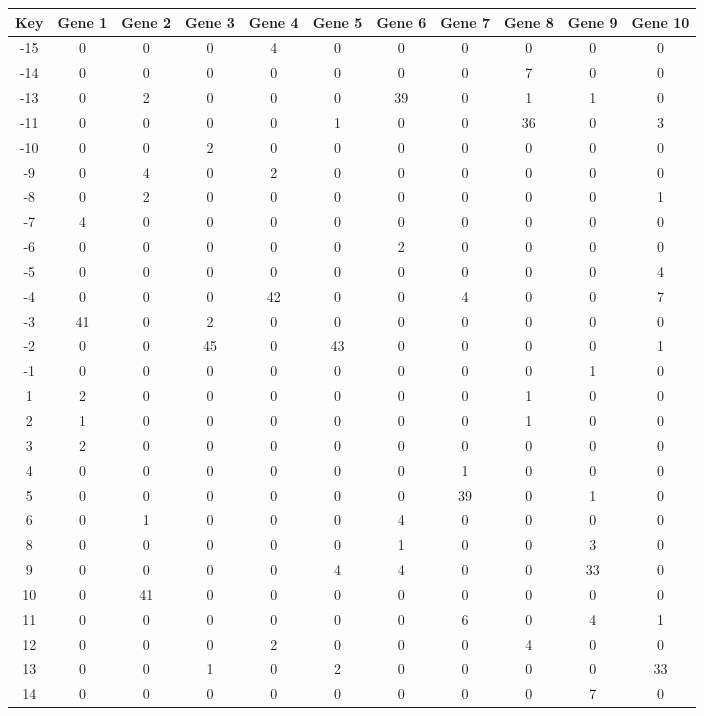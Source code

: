 \begin{tabular}{|c|c|c|c|c|c|c|c|c|c|c|}
\hline
Key & Gene 1 & Gene 2 & Gene 3 & Gene 4 & Gene 5 & Gene 6 & Gene 7 & Gene 8 & Gene 9 & Gene 10 \\
\hline
-15 & 0 & 0 & 0 & 4 & 0 & 0 & 0 & 0 & 0 & 0 \\
-14 & 0 & 0 & 0 & 0 & 0 & 0 & 0 & 7 & 0 & 0 \\
-13 & 0 & 2 & 0 & 0 & 0 & 39 & 0 & 1 & 1 & 0 \\
-11 & 0 & 0 & 0 & 0 & 1 & 0 & 0 & 36 & 0 & 3 \\
-10 & 0 & 0 & 2 & 0 & 0 & 0 & 0 & 0 & 0 & 0 \\
-9 & 0 & 4 & 0 & 2 & 0 & 0 & 0 & 0 & 0 & 0 \\
-8 & 0 & 2 & 0 & 0 & 0 & 0 & 0 & 0 & 0 & 1 \\
-7 & 4 & 0 & 0 & 0 & 0 & 0 & 0 & 0 & 0 & 0 \\
-6 & 0 & 0 & 0 & 0 & 0 & 2 & 0 & 0 & 0 & 0 \\
-5 & 0 & 0 & 0 & 0 & 0 & 0 & 0 & 0 & 0 & 4 \\
-4 & 0 & 0 & 0 & 42 & 0 & 0 & 4 & 0 & 0 & 7 \\
-3 & 41 & 0 & 2 & 0 & 0 & 0 & 0 & 0 & 0 & 0 \\
-2 & 0 & 0 & 45 & 0 & 43 & 0 & 0 & 0 & 0 & 1 \\
-1 & 0 & 0 & 0 & 0 & 0 & 0 & 0 & 0 & 1 & 0 \\
1 & 2 & 0 & 0 & 0 & 0 & 0 & 0 & 1 & 0 & 0 \\
2 & 1 & 0 & 0 & 0 & 0 & 0 & 0 & 1 & 0 & 0 \\
3 & 2 & 0 & 0 & 0 & 0 & 0 & 0 & 0 & 0 & 0 \\
4 & 0 & 0 & 0 & 0 & 0 & 0 & 1 & 0 & 0 & 0 \\
5 & 0 & 0 & 0 & 0 & 0 & 0 & 39 & 0 & 1 & 0 \\
6 & 0 & 1 & 0 & 0 & 0 & 4 & 0 & 0 & 0 & 0 \\
8 & 0 & 0 & 0 & 0 & 0 & 1 & 0 & 0 & 3 & 0 \\
9 & 0 & 0 & 0 & 0 & 4 & 4 & 0 & 0 & 33 & 0 \\
10 & 0 & 41 & 0 & 0 & 0 & 0 & 0 & 0 & 0 & 0 \\
11 & 0 & 0 & 0 & 0 & 0 & 0 & 6 & 0 & 4 & 1 \\
12 & 0 & 0 & 0 & 2 & 0 & 0 & 0 & 4 & 0 & 0 \\
13 & 0 & 0 & 1 & 0 & 2 & 0 & 0 & 0 & 0 & 33 \\
14 & 0 & 0 & 0 & 0 & 0 & 0 & 0 & 0 & 7 & 0 \\
\hline
\end{tabular}
